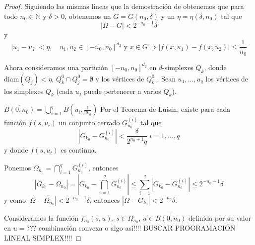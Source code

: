 \documentclass[a4paper,11pt]{amsart}
\theoremstyle{plain}
\theoremstyle{remark}
\theoremstyle{remark}
\numberwithin{equation}{section}
\begin{document}
\begin{proof} Siguiendo las mismas líneas que la demostración de  \cite[Lemma 17.1]{krasnosel2011integral} obtenemos que para todo $n_0\in \mathbb{N}$ y $\delta>0$, obtenemos un $G=G(n_0,\delta)$ y un $\eta=\eta(\delta,n_0)$ tal que
\[
|\Omega-G|<2^{-n_0-1}\delta
\]
y
\[
|u_1-u_2|<\eta,\quad u_1,u_2\in [-n_0,n_0]^{d_2} \text{ y } x\in G \Rightarrow |f(x,u_1)-f(x,u_2)|\leq \frac{1}{n_0}
\]

Ahora consideramos una partici\'on  $[-n_0,n_0]^{d_2}$ en $d$-simplexes  $Q_k$, donde
$\text{diam}(Q_j)< \eta$, $Q^0_k\cap Q^0_j=\emptyset$ y los vértices de $Q^0_k$ . Sean  $u_1,\ldots,u_q$ los vértices de los simplexes $Q_k$ (cada $u_j$ puede pertenecer a varios $Q_k$).

$\overline{B(0,n_0)}=\bigcup_{i=1}^{q} B(u_i,\frac{1}{2k_0})$
Por el Teorema de Luisin, existe para cada funci\'on $f(s,u_i)$ un conjunto cerrado $G_{n_0}^{(i)}$ tal que 
\[
|G_{k_0}-G_{n_0}^{(i)}|<\frac{\delta}{2^{n_0+1}q}\;i=1,\dots,q
\]
y donde $f(s,u_i)$ es continua.

Ponemos $\Omega_{n_0}=\bigcap_{i=1}^q G_{n_0}^{(i)}$, entonces
\[
|G_{k_0}-\Omega_{n_0}|=|G_{k_0}-\bigcap_{i=1}^q G_{n_0}^{(i)}|\leq 
\sum\limits_{i=1}^q |G_{k_0}-G_{n_0}^{(i)}|\leq 2^{-n_0-1}\delta
\]
y como $|\Omega-\Omega_{n_0}|<2^{-n_0-1}\delta$, entonces
$|\Omega-G_{k_0}|<2^{-n_0}\delta$.

Consideramos la funci\'on $f_{n_0}(s,u)$, $s \in  \Omega_{n_0}$, $u \in \overline{B(0,n_0)}$
definida por su valor en $u=???$ combinaci\'on convexa o algo as\'i!!!!
BUSCAR PROGRAMACI\'ON LINEAL SIMPLEX!!!!
\end{proof}

%
%


\end{document}
